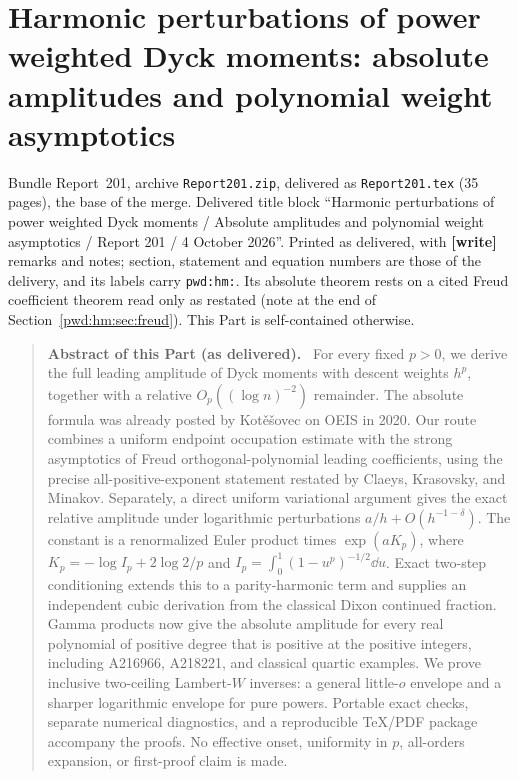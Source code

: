 \documentclass[11pt,letterpaper]{article}
\numberwithin{equation}{section}
\theoremstyle{remark}\newtheorem{remark}[theorem]{Remark}
\newcommand{\file}[1]{\nolinkurl{#1}}
\newenvironment{partabstract}{\begin{quote}\small\noindent\textbf{Abstract of this Part (as delivered).}\ }{\end{quote}}
\newcommand{\partsource}[1]{\par\noindent\begin{minipage}{\textwidth}\small #1\end{minipage}\par\medskip}
\begin{document}
\addtocounter{table}{-1}%
\endgroup
\clearpage


\part{Harmonic perturbations of power weighted Dyck moments: absolute amplitudes and polynomial weight asymptotics}\label{pwd:hm:part}
\partsource{Bundle Report~201, archive \file{Report201.zip}, delivered as \file{Report201.tex} (35 pages), the base of the merge. Delivered title block ``Harmonic perturbations of power weighted Dyck moments / Absolute amplitudes and polynomial weight asymptotics / Report 201 / 4 October 2026''. Printed as delivered, with \textbf{[write]} remarks and notes; section, statement and equation numbers are those of the delivery, and its labels carry \file{pwd:hm:}. Its absolute theorem rests on a cited Freud coefficient theorem read only as restated (note at the end of Section~\ref{pwd:hm:sec:freud}). This Part is self-contained otherwise.}
\begin{partabstract}
For every fixed $p>0$, we derive the full leading amplitude of Dyck moments with descent weights $h^p$, together with a relative $O_p((\log n)^{-2})$ remainder. The absolute formula was already posted by Kot\v e\v sovec on OEIS in 2020. Our route combines a uniform endpoint occupation estimate with the strong asymptotics of Freud orthogonal-polynomial leading coefficients, using the precise all-positive-exponent statement restated by Claeys, Krasovsky, and Minakov. Separately, a direct uniform variational argument gives the exact relative amplitude under logarithmic perturbations $a/h+O(h^{-1-\delta})$. The constant is a renormalized Euler product times $\exp(aK_p)$, where $K_p=-\log I_p+2\log2/p$ and $I_p=\int_0^1(1-u^p)^{-1/2}\dd u$. Exact two-step conditioning extends this to a parity-harmonic term and supplies an independent cubic derivation from the classical Dixon continued fraction. Gamma products now give the absolute amplitude for every real polynomial of positive degree that is positive at the positive integers, including A216966, A218221, and classical quartic examples. We prove inclusive two-ceiling Lambert-$W$ inverses: a general little-$o$ envelope and a sharper logarithmic envelope for pure powers. Portable exact checks, separate numerical diagnostics, and a reproducible TeX/PDF package accompany the proofs. No effective onset, uniformity in $p$, all-orders expansion, or first-proof claim is made.
\end{partabstract}
\end{document}

